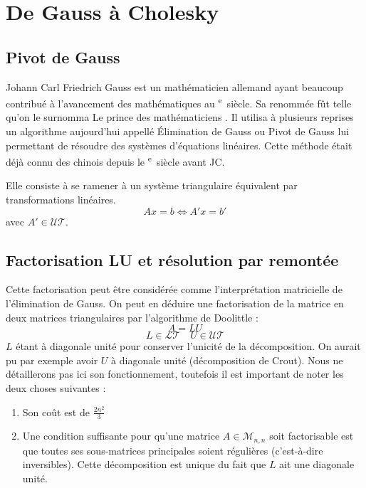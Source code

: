 \documentclass[a4paper, titlepage]{livret}													%
\def\siecle#1{\textsc{\romannumeral #1}\textsuperscript{e}~siècle} 							%
\begin{document}
	\section{De Gauss à Cholesky}
		\subsection{Pivot de Gauss}
			Johann Carl Friedrich Gauss est un mathématicien allemand ayant beaucoup contribué à l'avancement des mathématiques au \siecle{18}.
			Sa renommée fût telle qu'on le surnomma \og Le prince des mathématiciens \fg{}.
			Il utilisa à plusieurs reprises un algorithme aujourd'hui appellé \og Élimination de Gauss \fg{} ou \og Pivot de Gauss \fg{} lui permettant de résoudre des systèmes d'équations linéaires.
			Cette méthode était déjà connu des chinois depuis le \siecle{1} avant JC.

			Elle consiste à se ramener à un système triangulaire équivalent par transformations linéaires.
				\[Ax = b \Leftrightarrow A'x = b'\]
			avec $A' \in \mathcal{UT}$.
		
		\subsection{Factorisation LU et résolution par remontée}
			Cette factorisation peut être considérée comme l'interprétation matricielle de l'élimination de Gauss.
			On peut en déduire une factorisation de la matrice en deux matrices triangulaires par l'algorithme de Doolittle :
				\[A = LU \]
				\[ L \in \mathcal{LT} \quad U \in \mathcal{UT} \]
			$L$ étant à diagonale unité pour conserver l'unicité de la décomposition. On aurait pu par exemple avoir $U$ à diagonale unité (décomposition de Crout).
			Nous ne détaillerons pas ici son fonctionnement, toutefois il est important de noter les deux choses suivantes :
			\begin{enumerate}
				\item Son coût est de $\frac{2n^{2}}{3}$
				\item Une condition suffisante pour qu'une matrice $A \in \mathcal{M}_{n,n}$ soit factorisable est que toutes ses sous-matrices principales soient régulières (c'est-à-dire inversibles). Cette décomposition est unique du fait que $L$ ait une diagonale unité.
			\end{enumerate}
\end{document}
